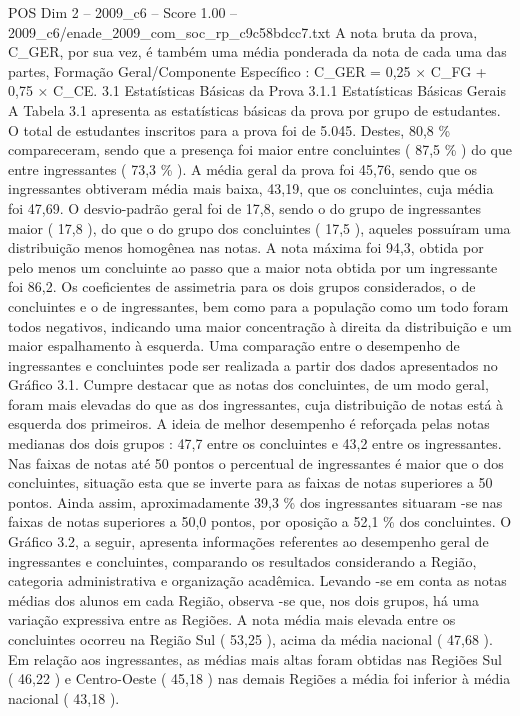 \begin{textsample}{POS Dim 2 – 2009\_c6 – Score 1.00 – 2009\_c6/enade\_2009\_com\_soc\_rp\_c9c58bdcc7.txt}
A nota bruta da prova, C\_GER, por sua vez, é também uma média ponderada da nota de cada uma das partes, Formação Geral/Componente Específico : C\_GER = 0,25 × C\_FG + 0,75 × C\_CE. 3.1 Estatísticas Básicas da Prova 3.1.1 Estatísticas Básicas Gerais A Tabela 3.1 apresenta as estatísticas básicas da prova por grupo de estudantes.
O total de estudantes inscritos para a prova foi de 5.045.
Destes, 80,8 \% compareceram, sendo que a presença foi maior entre concluintes ( 87,5 \% ) do que entre ingressantes ( 73,3 \% ).
A média geral da prova foi 45,76, sendo que os ingressantes obtiveram média mais baixa, 43,19, que os concluintes, cuja média foi 47,69.
O desvio-padrão geral foi de 17,8, sendo o do grupo de ingressantes maior ( 17,8 ), do que o do grupo dos concluintes ( 17,5 ), aqueles possuíram uma distribuição menos homogênea nas notas.
A nota máxima foi 94,3, obtida por pelo menos um concluinte ao passo que a maior nota obtida por um ingressante foi 86,2.
Os coeficientes de assimetria para os dois grupos considerados, o de concluintes e o de ingressantes, bem como para a população como um todo foram todos negativos, indicando uma maior concentração à direita da distribuição e um maior espalhamento à esquerda.
Uma comparação entre o desempenho de ingressantes e concluintes pode ser realizada a partir dos dados apresentados no Gráfico 3.1.
Cumpre destacar que as notas dos concluintes, de um modo geral, foram mais elevadas do que as dos ingressantes, cuja distribuição de notas está à esquerda dos primeiros.
A ideia de melhor desempenho é reforçada pelas notas medianas dos dois grupos : 47,7 entre os concluintes e 43,2 entre os ingressantes.
Nas faixas de notas até 50 pontos o percentual de ingressantes é maior que o dos concluintes, situação esta que se inverte para as faixas de notas superiores a 50 pontos.
Ainda assim, aproximadamente 39,3 \% dos ingressantes situaram -se nas faixas de notas superiores a 50,0 pontos, por oposição a 52,1 \% dos concluintes.
O Gráfico 3.2, a seguir, apresenta informações referentes ao desempenho geral de ingressantes e concluintes, comparando os resultados considerando a Região, categoria administrativa e organização acadêmica.
Levando -se em conta as notas médias dos alunos em cada Região, observa -se que, nos dois grupos, há uma variação expressiva entre as Regiões.
A nota média mais elevada entre os concluintes ocorreu na Região Sul ( 53,25 ), acima da média nacional ( 47,68 ).
Em relação aos ingressantes, as médias mais altas foram obtidas nas Regiões Sul ( 46,22 ) e Centro-Oeste ( 45,18 ) nas demais Regiões a média foi inferior à média nacional ( 43,18 ).

\end{textsample}
